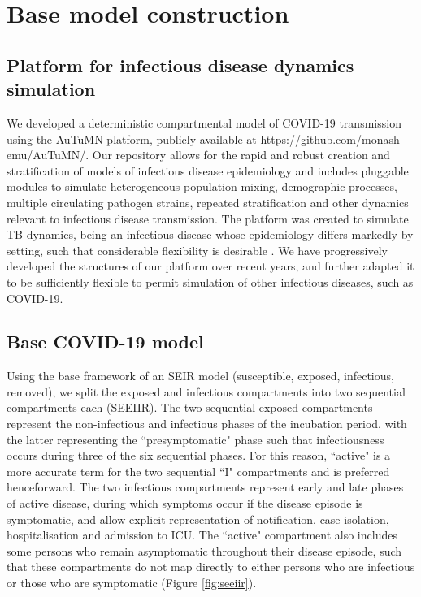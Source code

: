 
\section{Base model construction}
\subsection{Platform for infectious disease dynamics simulation}

We developed a deterministic compartmental model of COVID-19 transmission using the AuTuMN platform,
publicly available at https://github.com/monash-emu/AuTuMN/.
Our repository allows for the rapid and robust creation and stratification of models of infectious disease epidemiology
and includes pluggable modules to simulate heterogeneous population mixing, demographic processes, multiple circulating
pathogen strains, repeated stratification and other dynamics relevant to infectious disease transmission.
The platform was created to simulate TB dynamics, being an infectious disease whose epidemiology differs markedly
by setting, such that considerable flexibility is desirable \cite{RN18}.
We have progressively developed the structures of our platform over recent years,
and further adapted it to be sufficiently flexible
to permit simulation of other infectious diseases, such as COVID-19.

\subsection{Base COVID-19 model}
Using the base framework of an SEIR model (susceptible, exposed, infectious, removed), we split the exposed and infectious compartments into two sequential compartments each (SEEIIR). The two sequential exposed compartments represent the non-infectious and infectious phases of the incubation period, with the latter representing the ``presymptomatic" phase such that infectiousness occurs during three of the six sequential phases. For this reason, ``active" is a more accurate term for the two sequential ``I" compartments and is preferred henceforward. The two infectious compartments represent early and late phases of active disease, during which symptoms occur if the disease episode is symptomatic, and allow explicit representation of notification, case isolation, hospitalisation and admission to ICU. The ``active" compartment also includes some persons who remain asymptomatic throughout their disease episode, such that these compartments do not map directly to either persons who are infectious or those who are symptomatic (Figure \ref{fig:seeiir}).

